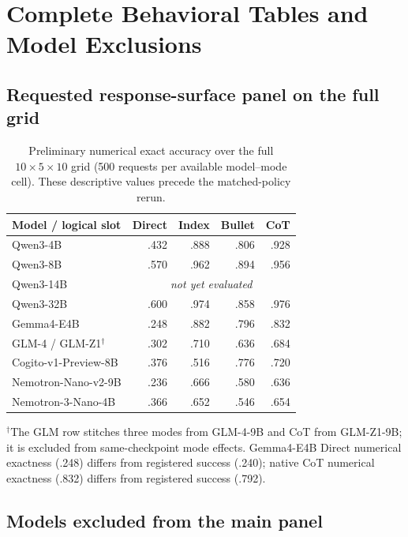 \section{Complete Behavioral Tables and Model Exclusions}
\label{app:behavior}

\subsection{Requested response-surface panel on the full grid}

\begin{table}[H]
\centering
\small
\caption{Preliminary numerical exact accuracy over the full \(10\times5\times10\) grid (500 requests per available model--mode cell). These descriptive values precede the matched-policy rerun.}
\label{tab:full-grid-panel}
\begin{tabular}{@{}lrrrr@{}}
\toprule
Model / logical slot & Direct & Index & Bullet & CoT \\
\midrule
Qwen3-4B                  & .432 & .888 & .806 & .928 \\
Qwen3-8B                  & .570 & .962 & .894 & .956 \\
Qwen3-14B                 & \multicolumn{4}{c}{\textit{not yet evaluated}} \\
Qwen3-32B                 & .600 & .974 & .858 & .976 \\
Gemma4-E4B                & .248 & .882 & .796 & .832 \\
GLM-4 / GLM-Z1\({}^\dagger\) & .302 & .710 & .636 & .684 \\
Cogito-v1-Preview-8B      & .376 & .516 & .776 & .720 \\
Nemotron-Nano-v2-9B       & .236 & .666 & .580 & .636 \\
Nemotron-3-Nano-4B        & .366 & .652 & .546 & .654 \\
\bottomrule
\end{tabular}
\vspace{0.25em}

\parbox{.94\textwidth}{\footnotesize \({}^\dagger\)The GLM row stitches three modes from GLM-4-9B and CoT from GLM-Z1-9B; it is excluded from same-checkpoint mode effects. Gemma4-E4B Direct numerical exactness (.248) differs from registered success (.240); native CoT numerical exactness (.832) differs from registered success (.792).}
\end{table}

\subsection{Models excluded from the main panel}

